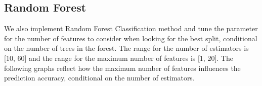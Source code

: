 \documentclass[12pt]{article}
\begin{document}
\subsection{Random Forest}
We also implement Random Forest Classification method and tune the parameter for the number of features to consider when looking for the best split, conditional on the number of trees in the forest. The range for the number of estimators is [10, 60] and the range for the maximum number of features is [1, 20]. The following graphs reflect how the maximum number of features influences the prediction accuracy, conditional on the number of estimators.
\begin{figure}[H]
\centering
{}
\end{figure}
\end{document}
